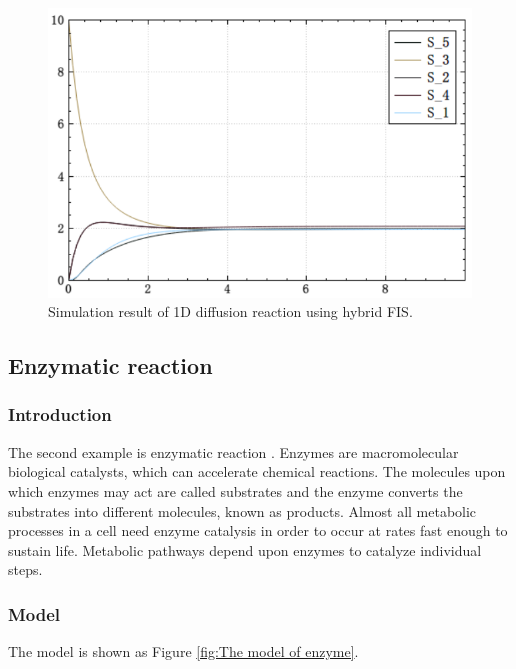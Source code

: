 \documentclass[journal,a4paper,onecolumn]{article}
\begin{document}
\begin{figure}[!hbt]
	\begin{center}
		\includegraphics[width=\columnwidth]{fig24}
		\caption{Simulation result of 1D diffusion reaction using hybrid FIS.}
		\label{fig:Simulation result of 1D diffusion reaction using hybrid FIS.}
	\end{center}
\end{figure}



\clearpage
\subsection{Enzymatic reaction}

\subsubsection{Introduction}
The second example is enzymatic reaction \cite{BHM11}. Enzymes are macromolecular biological catalysts, which can accelerate chemical reactions. The molecules upon which enzymes may act are called substrates and the enzyme converts the substrates into different molecules, known as products. Almost all metabolic processes in a cell need enzyme catalysis in order to occur at rates fast enough to sustain life. Metabolic pathways depend upon enzymes to catalyze individual steps. 

\subsubsection{Model}
The model is shown as Figure \ref{fig:The model of enzyme}.
\end{document}

